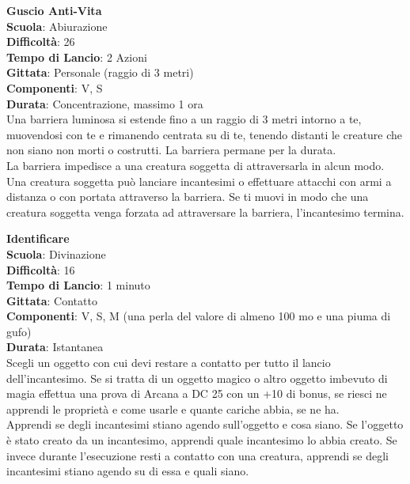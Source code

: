 \begin{multicols}{2}
\medskip\textbf{Guscio Anti-Vita}\\
\textbf{Scuola}: Abiurazione\\
\textbf{Difficoltà}: 26\\
\textbf{Tempo di Lancio}: 2 Azioni\\
\textbf{Gittata}: Personale (raggio di 3 metri)\\
\textbf{Componenti}: V, S\\
\textbf{Durata}: Concentrazione, massimo 1 ora\\
Una barriera luminosa si estende fino a un raggio di 3 metri intorno a te, muovendosi con te e rimanendo centrata su di te, tenendo distanti le creature che non siano non morti o costrutti. La barriera permane per la durata. \\
La barriera impedisce a una creatura soggetta di attraversarla in alcun modo. Una creatura soggetta può lanciare incantesimi o effettuare attacchi con armi a distanza o con portata attraverso la barriera. Se ti muovi in modo che una creatura soggetta venga forzata ad attraversare la barriera, l'incantesimo termina.

\medskip\textbf{Identificare}\\
\textbf{Scuola}: Divinazione\\
\textbf{Difficoltà}: 16\\
\textbf{Tempo di Lancio}: 1 minuto\\
\textbf{Gittata}: Contatto\\
\textbf{Componenti}: V, S, M (una perla del valore di almeno 100 mo e una piuma di gufo)\\ \textbf{Durata}: Istantanea\\
Scegli un oggetto con cui devi restare a contatto per tutto il lancio dell'incantesimo. Se si tratta di un oggetto magico o altro oggetto imbevuto di magia effettua una prova di Arcana a DC 25 con un +10 di bonus, se riesci ne apprendi le proprietà e come usarle e quante cariche abbia, se ne ha. \\
Apprendi se degli incantesimi stiano agendo sull'oggetto e cosa siano. Se l'oggetto è stato creato da un incantesimo, apprendi quale incantesimo lo abbia creato. Se invece durante l'esecuzione resti a contatto con una creatura, apprendi se degli incantesimi stiano agendo su di essa e quali siano.


\end{multicols}
